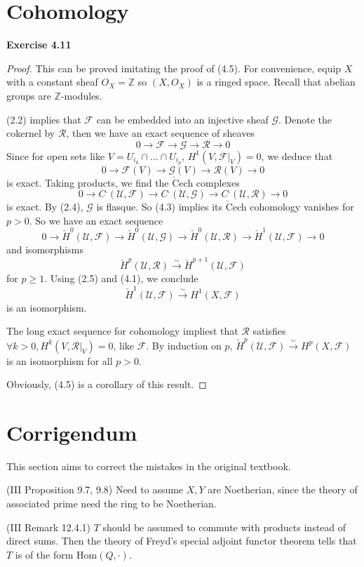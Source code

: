 \documentclass{article}
\begin{document}
\section{Cohomology}
\textbf{Exercise 4.11} 
\begin{proof}
This can be proved imitating the proof of (4.5). For convenience, equip $X$ with a constant sheaf $O_X = \mathbb{Z}$ so $(X, O_X)$ is a ringed space. Recall that abelian groups are $\mathbb{Z}$-modules.

(2.2) implies that $\mathscr{F}$ can be embedded into an injective sheaf $\mathscr{G}$. Denote the cokernel by $\mathscr{R}$, then we have an exact sequence of sheaves
\[
0 \longrightarrow \mathscr{F} \longrightarrow \mathscr{G} \longrightarrow \mathscr{R} \longrightarrow 0
\]
Since for open sets like $V = U_{i_0} \cap \dots \cap  U_{i_p}$, $H^1(V, \mathscr{F}|_V) = 0$, we deduce that
\[
0 \longrightarrow \mathscr{F}(V) \longrightarrow \mathscr{G}(V) \longrightarrow \mathscr{R}(V) \longrightarrow 0
\]
is exact. Taking products, we find the $\check{\mathrm{C}}$ech complexes
\[
0 \longrightarrow C^.(\mathcal{U}, \mathscr{F}) \longrightarrow C^.(\mathcal{U}, \mathscr{G}) \longrightarrow C^.(\mathcal{U}, \mathscr{R}) \longrightarrow 0
\]
is exact. By (2.4), $\mathscr{G}$ is flasque. So (4.3) implies its $\check{\mathrm{C}}$ech cohomology vanishes for $p > 0$. So we have an exact sequence
\[
0 \longrightarrow \check{H}^0(\mathcal{U}, \mathscr{F}) \longrightarrow \check{H}^0(\mathcal{U}, \mathscr{G}) \longrightarrow \check{H}^0(\mathcal{U}, \mathscr{R}) \longrightarrow \check{H}^1(\mathcal{U}, \mathscr{F})  \longrightarrow 0
\]
and isomorphisms
\[
\check{H}^p(\mathcal{U}, \mathscr{R}) \xrightarrow{\sim} \check{H}^{p+1}(\mathcal{U}, \mathscr{F})
\]
for $p \geq 1$. Using (2.5) and (4.1), we conclude
\[
\check{H}^1(\mathcal{U}, \mathscr{F}) \xrightarrow{\sim} H^{1}(X, \mathscr{F})
\]
is an isomorphism.

The long exact sequence for cohomology impliest that $\mathscr{R}$ satisfies $\forall k > 0, H^k(V, \mathscr{R}|_V) = 0$, like $\mathscr{F}$. By induction on $p$, $\check{H}^p(\mathcal{U}, \mathscr{F}) \xrightarrow{\sim} H^{p}(X, \mathscr{F})$ is an isomorphism for all $p > 0$.

Obviously, (4.5) is a corollary of this result.
\end{proof}

\section{Corrigendum}
  This section aims to correct the mistakes in the original textbook.
  
(III Proposition 9.7, 9.8) Need to assume $X, Y$ are Noetherian, since the theory of associated prime need the ring to be Noetherian.

(III Remark 12.4.1) $T$ should be assumed to commute with products instead of direct sums. Then the theory of Freyd's special adjoint functor theorem tells that $T$ is of the form Hom$(Q, \cdot)$.



\end{document}
